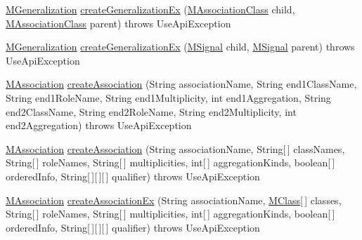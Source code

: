 \begin{DoxyCompactItemize}
\hyperlink{classorg_1_1tzi_1_1use_1_1uml_1_1mm_1_1_m_generalization}{M\-Generalization} \hyperlink{classorg_1_1tzi_1_1use_1_1api_1_1_use_model_api_ac071a226773f76af8d560957b63dec3c}{create\-Generalization\-Ex} (\hyperlink{interfaceorg_1_1tzi_1_1use_1_1uml_1_1mm_1_1_m_association_class}{M\-Association\-Class} child, \hyperlink{interfaceorg_1_1tzi_1_1use_1_1uml_1_1mm_1_1_m_association_class}{M\-Association\-Class} parent)  throws Use\-Api\-Exception 
\item 
\hyperlink{classorg_1_1tzi_1_1use_1_1uml_1_1mm_1_1_m_generalization}{M\-Generalization} \hyperlink{classorg_1_1tzi_1_1use_1_1api_1_1_use_model_api_ad6c81bfa15e508899ebf43f741985859}{create\-Generalization\-Ex} (\hyperlink{interfaceorg_1_1tzi_1_1use_1_1uml_1_1mm_1_1commonbehavior_1_1communications_1_1_m_signal}{M\-Signal} child, \hyperlink{interfaceorg_1_1tzi_1_1use_1_1uml_1_1mm_1_1commonbehavior_1_1communications_1_1_m_signal}{M\-Signal} parent)  throws Use\-Api\-Exception 
\item 
\hyperlink{interfaceorg_1_1tzi_1_1use_1_1uml_1_1mm_1_1_m_association}{M\-Association} \hyperlink{classorg_1_1tzi_1_1use_1_1api_1_1_use_model_api_adc8f1f272001820dcdd535aa2da21b5e}{create\-Association} (String association\-Name, String end1\-Class\-Name, String end1\-Role\-Name, String end1\-Multiplicity, int end1\-Aggregation, String end2\-Class\-Name, String end2\-Role\-Name, String end2\-Multiplicity, int end2\-Aggregation)  throws Use\-Api\-Exception 
\item 
\hyperlink{interfaceorg_1_1tzi_1_1use_1_1uml_1_1mm_1_1_m_association}{M\-Association} \hyperlink{classorg_1_1tzi_1_1use_1_1api_1_1_use_model_api_a2921ed8bef0150be26df3532ae6e4f8e}{create\-Association} (String association\-Name, String\mbox{[}$\,$\mbox{]} class\-Names, String\mbox{[}$\,$\mbox{]} role\-Names, String\mbox{[}$\,$\mbox{]} multiplicities, int\mbox{[}$\,$\mbox{]} aggregation\-Kinds, boolean\mbox{[}$\,$\mbox{]} ordered\-Info, String\mbox{[}$\,$\mbox{]}\mbox{[}$\,$\mbox{]}\mbox{[}$\,$\mbox{]} qualifier)  throws Use\-Api\-Exception 
\item 
\hyperlink{interfaceorg_1_1tzi_1_1use_1_1uml_1_1mm_1_1_m_association}{M\-Association} \hyperlink{classorg_1_1tzi_1_1use_1_1api_1_1_use_model_api_a67669e2253f592f45ba7af971c288694}{create\-Association\-Ex} (String association\-Name, \hyperlink{interfaceorg_1_1tzi_1_1use_1_1uml_1_1mm_1_1_m_class}{M\-Class}\mbox{[}$\,$\mbox{]} classes, String\mbox{[}$\,$\mbox{]} role\-Names, String\mbox{[}$\,$\mbox{]} multiplicities, int\mbox{[}$\,$\mbox{]} aggregation\-Kinds, boolean\mbox{[}$\,$\mbox{]} ordered\-Info, String\mbox{[}$\,$\mbox{]}\mbox{[}$\,$\mbox{]}\mbox{[}$\,$\mbox{]} qualifier)  throws Use\-Api\-Exception 

\end{DoxyCompactItemize}
